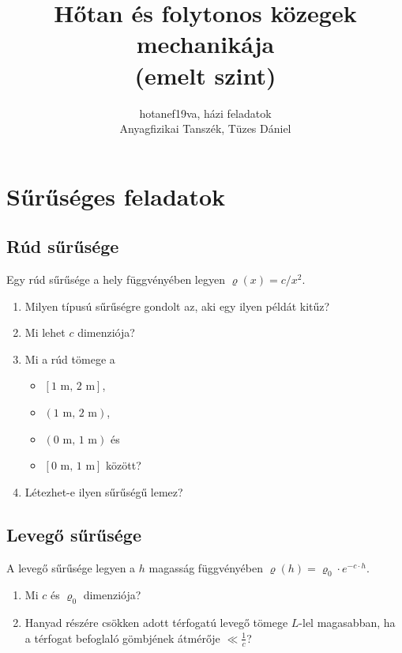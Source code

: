 \documentclass[12pt,a4paper]{scrartcl}
\begin{document}
\title{Hőtan és folytonos közegek mechanikája\\(emelt szint)}
\author{hotanef19va, házi feladatok\\Anyagfizikai Tanszék, Tüzes Dániel}
\maketitle
\tableofcontents

\iffalse %
\section{Sűrűséges feladatok}
\subsection{Rúd sűrűsége}
Egy rúd sűrűsége a hely függvényében legyen $\varrho \left( x \right) = c/{x^2}$.
\begin{enumerate}
\item Milyen típusú sűrűségre gondolt az, aki egy ilyen példát kitűz?
\item Mi lehet $c$ dimenziója?
\item Mi a rúd tömege a
\begin{itemize}
\item $\left[ 1{\text{ m, }}2{\text{ m}} \right]$,
\item $\left( 1{\text{ m, }}2{\text{ m}} \right)$,
\item ${\left( {0{\text{ m, }}1{\text{ m}}} \right)}$ és
\item ${\left[ {0{\text{ m, }}1{\text{ m}}} \right]}$ között?
\end{itemize}
\item Létezhet-e ilyen sűrűségű lemez?
\end{enumerate}
\subsection{Levegő sűrűsége}
A levegő sűrűsége legyen a $h$ magasság függvényében $\varrho \left( h \right) = {\varrho _0} \cdot {e^{ - c \cdot h}}$.
\begin{enumerate}
\item Mi $c$ és $\varrho_0$ dimenziója?
\item Hanyad részére csökken adott térfogatú levegő tömege $L$-lel magasabban, ha a térfogat befoglaló gömbjének átmérője $ \ll \frac{1}{c}$?
\end{enumerate}
\end{document}
